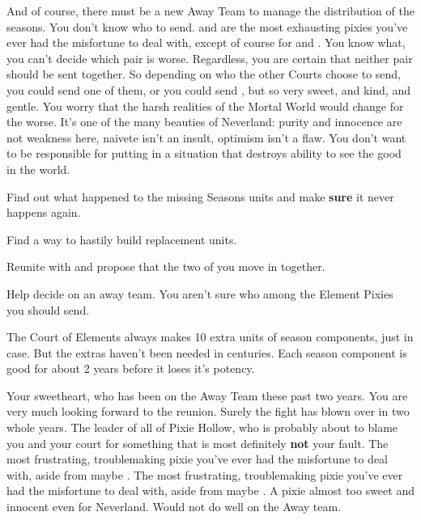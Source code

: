 \documentclass[char]{PP}
\begin{document}
And of course, there must be a new Away Team to manage the distribution of the seasons.  You don't know who to send. \cETitan{} and \cFTitan{} are the most exhausting pixies you've ever had the misfortune to deal with, except of course for \cEAirship{} and \cMAirship{}. You know what, you can't decide which pair is worse. Regardless, you are certain that neither pair should be sent together. So depending on who the other Courts choose to send, you could send one of them, or you could send \cESweet{}, but \cESweet{\theyare} so very sweet, and kind, and gentle. You worry that the harsh realities of the Mortal World would change \cESweet{\them} for the worse. It's one of the many beauties of Neverland: purity and innocence are not weakness here, naivete isn't an insult, optimism isn't a flaw. You don't want to be responsible for putting \cESweet{} in a situation that destroys \cESweet{\their} ability to see the good in the world.


\begin{itemz}
	\item Find out what happened to the missing Seasons units and make \textbf{sure} it never happens again.
	\item Find a way to hastily build replacement units.
	\item Reunite with \cELove{} and propose that the two of you move in together.
	\item Help \cSHead{} decide on an away team. You aren't sure who among the Element Pixies you should send.
\end{itemz}

\begin{itemz}[Notes]
	\item The Court of Elements always makes 10 extra units of season components, just in case. But the extras haven't been needed in centuries. Each season component is good for about 2 years before it loses it's potency.
\end{itemz}

\begin{contacts}
	\contact{\cELove{}} Your sweetheart, who has been on the Away Team these past two years. You are very much looking forward to the reunion. Surely the fight has blown over in two whole years.
	\contact{\cSHead{}} The leader of all of Pixie Hollow, who is probably about to blame you and your court for something that is most definitely \textbf{not} your fault.
	\contact{\cEAirship{}} The most frustrating, troublemaking pixie you've ever had the misfortune to deal with, aside from maybe \cETitan{}.
	\contact{\cETitan{}} The most frustrating, troublemaking pixie you've ever had the misfortune to deal with, aside from maybe \cEAirship{}.
	\contact{\cESweet{}} A pixie almost too sweet and innocent even for Neverland. Would not do well on the Away team.
\end{contacts}
\end{document}
